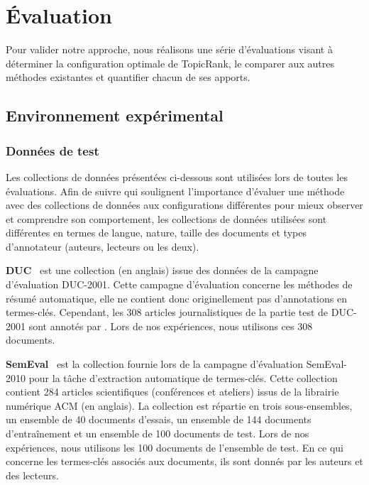 \section{Évaluation}
\label{sec:evaluation}
  Pour valider notre approche, nous réalisons une série d'évaluations visant à
  déterminer la configuration optimale de TopicRank, le comparer aux autres
  méthodes existantes et quantifier chacun de ses apports.

  \subsection{Environnement expérimental}
  \label{subsec:environnement_experimental}
    \subsubsection{Données de test}
    \label{subsubsec:donnees_de_test}
      Les collections de données présentées ci-dessous sont utilisées lors de
      toutes les évaluations. Afin de suivre  qui
      soulignent l'importance d'évaluer une méthode avec des collections de
      données aux configurations différentes pour mieux observer et comprendre
      son comportement, les collections de données utilisées sont différentes en
      termes de langue, nature, taille des documents et types d'annotateur
      (auteurs, lecteurs ou les deux).

      \textbf{DUC}~\cite{over2001duc} est une collection (en anglais) issue des
      données de la campagne d'évaluation DUC-2001. Cette campagne d'évaluation
      concerne les méthodes de résumé automatique, elle ne contient donc
      originellement pas d'annotations en termes-clés. Cependant, les 308
      articles journalistiques de la partie test de DUC-2001 sont annotés par
      . Lors de nos expériences, nous utilisons ces
      308 documents.

      \textbf{SemEval}~\cite{kim2010semeval} est la collection fournie lors de
      la campagne d'évaluation SemEval-2010 pour la tâche d'extraction
      automatique de termes-clés. Cette collection contient 284 articles
      scientifiques (conférences et ateliers) issus de la librairie numérique
      ACM (en anglais). La collection est répartie en trois sous-ensembles, un
      ensemble de 40 documents d'essais, un ensemble de 144 documents
      d'entraînement et un ensemble de 100 documents de test. Lors de nos
      expériences, nous utilisons les 100 documents de l'ensemble de test. En ce
      qui concerne les termes-clés associés aux documents, ils sont donnés par
      les auteurs et des lecteurs.

